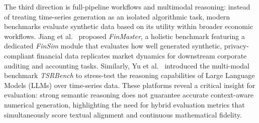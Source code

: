The third direction is full-pipeline workflows and multimodal reasoning: instead of treating time-series generation as an isolated algorithmic task, modern benchmarks evaluate synthetic data based on its utility within broader economic workflows. Jiang et al.~\citep{finmaster2025} proposed \textit{FinMaster}, a holistic benchmark featuring a dedicated \textit{FinSim} module that evaluates how well generated synthetic, privacy-compliant financial data replicates market dynamics for downstream corporate auditing and accounting tasks. Similarly, Yu et al.~\citep{tsrbench2026} introduced the multi-modal benchmark \textit{TSRBench} to stress-test the reasoning capabilities of Large Language Models (LLMs) over time-series data. These platforms reveal a critical insight for evaluation: strong semantic reasoning does not guarantee accurate context-aware numerical generation, highlighting the need for hybrid evaluation metrics that simultaneously score textual alignment and continuous mathematical fidelity.

